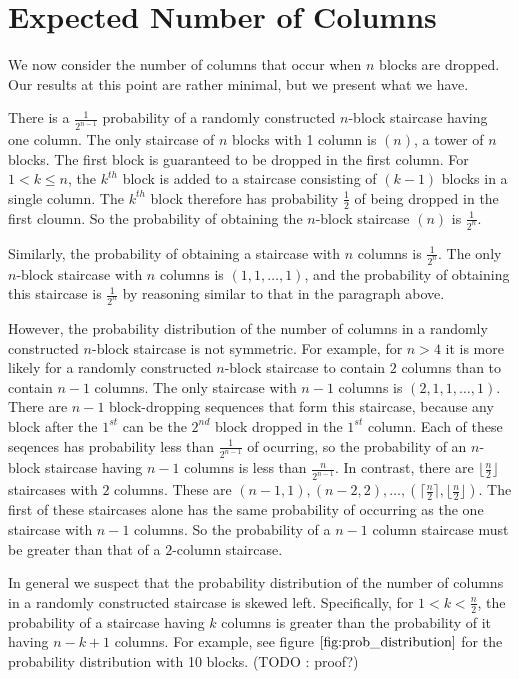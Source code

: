 \documentclass[12pt]{amsart}
\newcommand{\newsection}[2]{
\section{#1 \label{#2}}
}
\begin{document}
\newsection{Expected Number of Columns}{sec:expectedcolumns}
We now consider the number of columns that occur when $n$ blocks are dropped. Our results at this point are rather minimal, but we present what we have.

There is a $\frac{1}{2^{n-1}}$ probability of a randomly constructed $n$-block staircase having one column. The only staircase of $n$ blocks with 1 column is $(n)$, a tower of $n$ blocks. The first block is guaranteed to be dropped in the first column. For $1<k \leq n$, the $k^{th}$ block is added to a staircase consisting of $(k-1)$ blocks in a single column. The $k^{th}$ block therefore has probability $\frac{1}{2}$ of being dropped in the first cloumn. So the probability of obtaining the $n$-block staircase $(n)$ is $\frac{1}{2^n}$.

Similarly, the probability of obtaining a staircase with $n$ columns is $\frac{1}{2^{n}}$. The only $n$-block staircase with $n$ columns is $(1, 1, \ldots, 1)$, and the probability of obtaining this staircase is $\frac{1}{2^{n}}$ by reasoning similar to that in the paragraph above.

However, the probability distribution of the number of columns in a randomly constructed $n$-block staircase is not symmetric. For example, for $n > 4$ it is more likely for a randomly constructed $n$-block staircase to contain $2$ columns than to contain $n-1$ columns. The only staircase with $n-1$ columns is $(2, 1, 1, \ldots, 1)$. There are $n-1$ block-dropping sequences that form this staircase, because any block after the $1^{st}$ can be the $2^{nd}$ block dropped in the $1^{st}$ column. Each of these seqences has probability less than $\frac{1}{2^{n-1}}$ of ocurring, so the probability of an $n$-block staircase having $n-1$ columns is less than $\frac{n}{2^{n-1}}$.  In contrast, there are $\lfloor \frac{n}{2} \rfloor$ staircases with $2$ columns. These are $(n-1, 1), (n-2, 2), \ldots, (\lceil \frac{n}{2} \rceil, \lfloor \frac{n}{2} \rfloor)$. The first of these staircases alone has the same probability of occurring  as the one staircase with $n-1$ columns. So the probability of a $n-1$ column staircase must be greater than that of a $2$-column staircase.

In general we suspect that the probability distribution of the number of columns in a randomly constructed staircase is skewed left. Specifically, for $1 < k < \frac{n}{2}$, the probability of a staircase having $k$ columns is greater than the probability of it having $n-k+1$ columns. For example, see figure $\ref{fig:prob_distribution}$ for the probability distribution with 10 blocks. (TODO : proof?)
\end{document}
